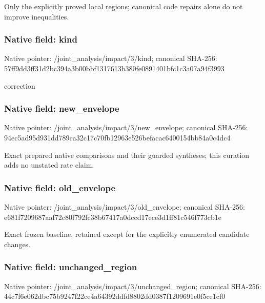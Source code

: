 \documentclass[10pt,a4paper]{article}
\begin{document}
\begingroup\raggedright\sloppy Only the explicitly proved local regions;\allowbreak{} canonical code repairs alone do not improve inequalities.\par\endgroup

\subsubsection{Native field: kind}
Native pointer: /joint\_\allowbreak{}analysis/impact/3/kind; canonical SHA-256: 57ff9dd3ff31d2bc394a3b00bbf1317613b380fe0891401bfc1c3a07a94f3993

\begingroup\raggedright\sloppy correction\par\endgroup

\subsubsection{Native field: new\_\allowbreak{}envelope}
Native pointer: /joint\_\allowbreak{}analysis/impact/3/new\_\allowbreak{}envelope; canonical SHA-256: 94ec5ad95d931dd789ca32c17c70fb12963e526befacac6400154bb84a0c4dc4

\begingroup\raggedright\sloppy Exact prepared native comparisons and their guarded syntheses;\allowbreak{} this curation adds no unstated rate claim.\par\endgroup

\subsubsection{Native field: old\_\allowbreak{}envelope}
Native pointer: /joint\_\allowbreak{}analysis/impact/3/old\_\allowbreak{}envelope; canonical SHA-256: e681f7209687aaf72c80f792fc38b67417a0dccd17ece3d1ff81c546f773cb1e

\begingroup\raggedright\sloppy Exact frozen baseline,\allowbreak{} retained except for the explicitly enumerated candidate changes.\par\endgroup

\subsubsection{Native field: unchanged\_\allowbreak{}region}
Native pointer: /joint\_\allowbreak{}analysis/impact/3/unchanged\_\allowbreak{}region; canonical SHA-256: 44c7f6e062dbc75b9247f22ce4a64392ddfd8802dd0387f1209691e0f5ce1cf0
\end{document}
